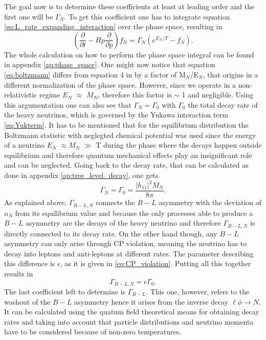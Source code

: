 The goal now is to determine these coefficients at least at leading order and the first one will be $\Gamma_N$. To get this coefficient one has to integrate equation \eqref{eq:L_rate_expanding_interaction} over the phase space, resulting in
\begin{equation}
	\left(\frac{\partial}{\partial t}-Hp\frac{\partial}{\partial p}\right)f_N=\Gamma_N\left(e^{E_N/T}-f_N\right).
	\label{eq:boltzmann}
\end{equation}
The whole calculation on how to perform the phase space integral can be found in appendix \ref{ap:phase_space}. \newline\indent
One might now notice that equation \eqref{eq:boltzmann} differs from equation 4 in \cite{Bodeker:2013qaa} by a factor of M$_N$/E$_N$, that origins in a different normalization of the phase space. However, since we operate in a non-relativistic regime $E_N$ $\approx$ $M_N$, therefore this factor is $\sim$ 1 and negligible. Using this argumentation one can also see that $\Gamma_N=\Gamma_0$ with $\Gamma_0$ the total decay rate of the heavy neutrinos, which is governed by the Yukawa interaction term \eqref{eq:Yukterm}. It has to be mentioned that for the equilibrium distribution the Boltzmann statistic with neglegted chemical potential was used since the energy of a neutrino $E_N$ $\approx M_N$ $\gg$ T during the phase where the decays happen outside equilibrium and therefore quantum mechanical effects play an insignificant role and can be neglected. Going back to the decay rate, that can be calculated as done in appendix \ref{ap:tree_level_decay}, one gets
\begin{equation}
\Gamma_N=\Gamma_0=\frac{|h_{11}|^2M_N}{8\pi}.
\label{eq:Gamma_N}
\end{equation}
As explained above, $\Gamma_{B-L,N}$ connects the $B-L$ asymmetry with the deviation of $n_N$ from its equilibrium value and because the only processes able to produce a $B-L$ asymmetry  are the decays of the heavy neutrino and therefore $\Gamma_{B-L,N}$ is directly connected to its decay rate. On the other hand though, any $B-L$ asymmetry can only arise through CP violation, meaning the neutrino has to decay into leptons and anti-leptons at different rates. The parameter describing this difference is $\epsilon$, as it is given in \eqref{eq:CP_violation}. Putting all this together results in 
\begin{equation}
	\Gamma_{B-L,N}=\epsilon\Gamma_0.
	\label{eq:Gamma_B-L,N}
\end{equation}
The last coefficient left to determine is $\Gamma_{B-L}$. This one, however, refers to the washout of the $B-L$ asymmetry hence it arises from the inverse decay $\ell\phi\rightarrow N$. It can be calculated using the quatum field theoretical means for obtaining decay rates and taking into account that particle distributions and neutrino momenta have to be considered because of non-zero temperatures.\cite[Eq. (10)]{Bodeker:2013qaa}
